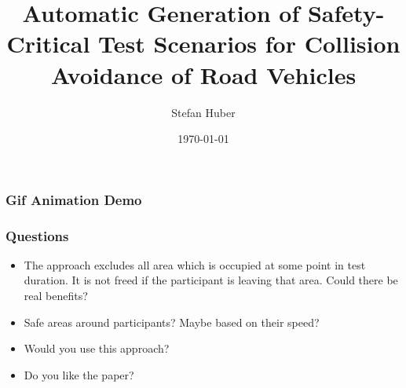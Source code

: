 \documentclass{beamer}
\title{Automatic Generation of Safety-Critical Test Scenarios for Collision Avoidance of Road Vehicles}
\author{Stefan Huber}
\date{\today}
\begin{document}
\maketitle

\begin{frame}
    \frametitle{Gif Animation Demo}
\end{frame}

\begin{frame}
    \frametitle{Questions}
    \begin{itemize}
        \item The approach excludes all area which is occupied at some point in test duration.
            It is not freed if the participant is leaving that area.
            Could there be real benefits?
        \item Safe areas around participants? Maybe based on their speed?
        \item Would you use this approach?
        \item Do you like the paper?
    \end{itemize}
\end{frame}
\end{document}
